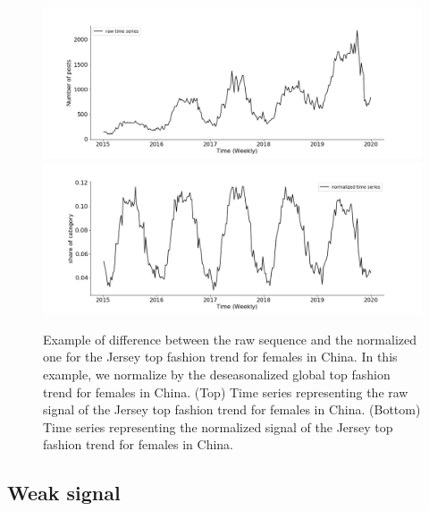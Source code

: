 \documentclass[review]{elsarticle}
\begin{document}
\begin{figure}
\centering
  \includegraphics[width=1.\linewidth]{cn_female_top_raw}
  \includegraphics[width=1.\linewidth]{cn_female_top_norm}
\caption{Example of difference between the raw sequence and the normalized one for the Jersey top fashion trend for females in China. In this example, we normalize by the deseasonalized global top fashion trend for females in China. (Top) Time series representing the raw signal of the Jersey top fashion trend for females in China. (Bottom) Time series representing the normalized signal of the Jersey top fashion trend for females in China.}
\label{fig:normalization}
\end{figure}

\subsection{Weak signal}
\end{document}
